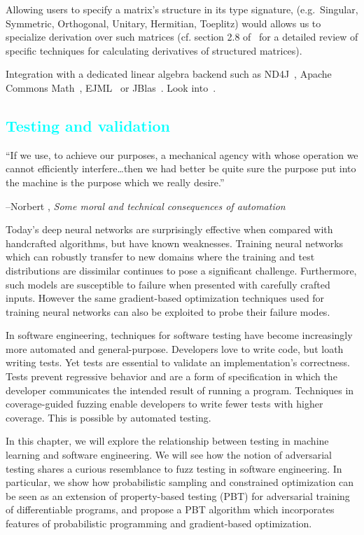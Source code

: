 \documentclass[12pt,initial,twoside,maitrise]{dms}
\newcommand{\medium}[1]{\textcolor{cyan}{#1}}
\numberwithin{equation}{section}
\numberwithin{table}{chapter}
\numberwithin{figure}{chapter}
\begin{document}
Allowing users to specify a matrix's structure in its type signature, (e.g.\ Singular, Symmetric, Orthogonal, Unitary, Hermitian, Toeplitz) would allows us to specialize derivation over such matrices (cf. section 2.8 of~\citet{petersen2012matrix} for a detailed review of specific techniques for calculating derivatives of structured matrices).

Integration with a dedicated linear algebra backend such as ND4J~\citep{team2016nd4j}, Apache Commons Math~\citep{developers2012apache}, EJML~\citep{abeles2010efficient} or JBlas~\citep{braun2011jblas}. Look into~\cite{makwana2018numlin}.

\medium{\chapter{Testing and validation}\label{ch:difftest}}

\setlength{\epigraphwidth}{0.80\textwidth}
\epigraph{``If we use, to achieve our purposes, a mechanical agency with whose operation we cannot efficiently interfere\ldots then we had better be quite sure the purpose put into the machine is the purpose which we really desire.''}{\begin{flushright}--Norbert \citet{wiener1960some}, \textit{Some moral and technical consequences of automation}~\end{flushright}}

Today's deep neural networks are surprisingly effective when compared with handcrafted algorithms, but have known weaknesses. Training neural networks which can robustly transfer to new domains where the training and test distributions are dissimilar continues to pose a significant challenge. Furthermore, such models are susceptible to failure when presented with carefully crafted inputs. However the same gradient-based optimization techniques used for training neural networks can also be exploited to probe their failure modes.

In software engineering, techniques for software testing have become increasingly more automated and general-purpose. Developers love to write code, but loath writing tests. Yet tests are essential to validate an implementation's correctness. Tests prevent regressive behavior and are a form of specification in which the developer communicates the intended result of running a program. Techniques in coverage-guided fuzzing enable developers to write fewer tests with higher coverage. This is possible by automated testing.

In this chapter, we will explore the relationship between testing in machine learning and software engineering. We will see how the notion of adversarial testing shares a curious resemblance to fuzz testing in software engineering. In particular, we show how probabilistic sampling and constrained optimization can be seen as an extension of property-based testing (PBT) for adversarial training of differentiable programs, and propose a PBT algorithm which incorporates features of probabilistic programming and gradient-based optimization.
\end{document}
